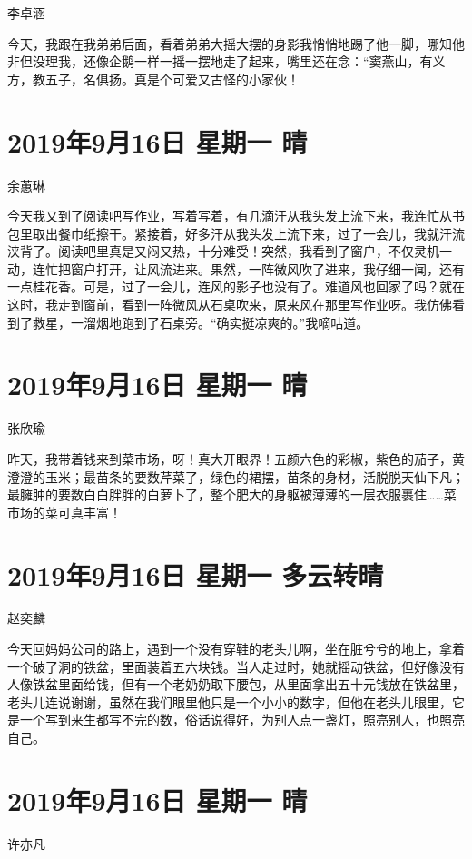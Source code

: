 李卓涵

今天，我跟在我弟弟后面，看着弟弟大摇大摆的身影我悄悄地踢了他一脚，哪知他非但没理我，还像企鹅一样一摇一摆地走了起来，嘴里还在念：``窦燕山，有义方，教五子，名俱扬。真是个可爱又古怪的小家伙！

\section{2019年9月16日 星期一 晴}

余蕙琳

今天我又到了阅读吧写作业，写着写着，有几滴汗从我头发上流下来，我连忙从书包里取出餐巾纸擦干。紧接着，好多汗从我头发上流下来，过了一会儿，我就汗流浃背了。阅读吧里真是又闷又热，十分难受！突然，我看到了窗户，不仅灵机一动，连忙把窗户打开，让风流进来。果然，一阵微风吹了进来，我仔细一闻，还有一点桂花香。可是，过了一会儿，连风的影子也没有了。难道风也回家了吗？就在这时，我走到窗前，看到一阵微风从石桌吹来，原来风在那里写作业呀。我仿佛看到了救星，一溜烟地跑到了石桌旁。``确实挺凉爽的。''我嘀咕道。

\section{2019年9月16日 星期一 晴}

张欣瑜

昨天，我带着钱来到菜市场，呀！真大开眼界！五颜六色的彩椒，紫色的茄子，黄澄澄的玉米；最苗条的要数芹菜了，绿色的裙摆，苗条的身材，活脱脱天仙下凡；最臃肿的要数白白胖胖的白萝卜了，整个肥大的身躯被薄薄的一层衣服裹住\ldots\ldots 菜市场的菜可真丰富！

\section{2019年9月16日 星期一 多云转晴}

赵奕麟

今天回妈妈公司的路上，遇到一个没有穿鞋的老头儿啊，坐在脏兮兮的地上，拿着一个破了洞的铁盆，里面装着五六块钱。当人走过时，她就摇动铁盆，但好像没有人像铁盆里面给钱，但有一个老奶奶取下腰包，从里面拿出五十元钱放在铁盆里，老头儿连说谢谢，虽然在我们眼里他只是一个小小的数字，但他在老头儿眼里，它是一个写到来生都写不完的数，俗话说得好，为别人点一盏灯，照亮别人，也照亮自己。

\section{2019年9月16日 星期一 晴}

许亦凡

